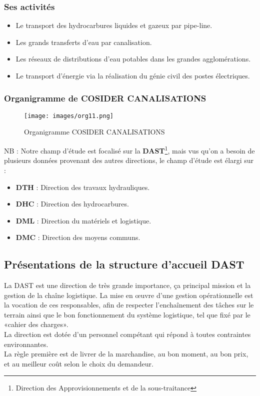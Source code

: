 \documentclass{report}
\begin{document}
\subsubsection{Ses activités}
\begin{itemize}
    \item Le transport des hydrocarbures liquides et gazeux par pipe-line.
    \item Les grands transferts d’eau par canalisation.
    \item Les réseaux de distributions d’eau potables dans les grandes agglomérations.
    \item Le transport d’énergie via la réalisation du génie civil des postes électriques.
\end{itemize}

\newpage
\subsubsection{Organigramme de COSIDER CANALISATIONS}
\vspace*{0.5cm}
\begin{figure}[h]
        \centering
            \texttt{[image: images/org11.png]}
        \caption{Organigramme COSIDER CANALISATIONS}
 \end{figure}
 \vspace*{1cm}
NB : Notre champ d’étude est focalisé sur la \textbf{DAST}\protect\footnote{Direction des Approvisionnements et de la sous-traitance}, mais vus qu’on a besoin de plusieurs données provenant des autres directions, le champ d’étude est élargi sur :

\begin{itemize}
    \item \textbf{DTH} : Direction des travaux hydrauliques.
    \item \textbf{DHC} : Direction des hydrocarbures.
    \item \textbf{DML} : Direction du matériels et logistique.
    \item \textbf{DMC} : Direction des moyens communs.
\end{itemize}

\newpage
\subsection{Présentations de la structure d’accueil DAST}
 \vspace*{0.5cm}

La DAST est une direction de très grande importance, ça principal mission et la gestion de la chaîne logistique.
La mise en œuvre d'une gestion opérationnelle est la vocation de ces responsables, afin de respecter l'enchaînement des tâches sur le terrain ainsi que le bon fonctionnement du système logistique, tel que fixé par le «cahier des charges».\\La direction est dotée d’un personnel compétant qui répond à toutes contraintes environnantes.\\
La règle première est de livrer de la marchandise, au bon moment, au bon prix, et au meilleur coût selon le choix du demandeur.
\end{document}
